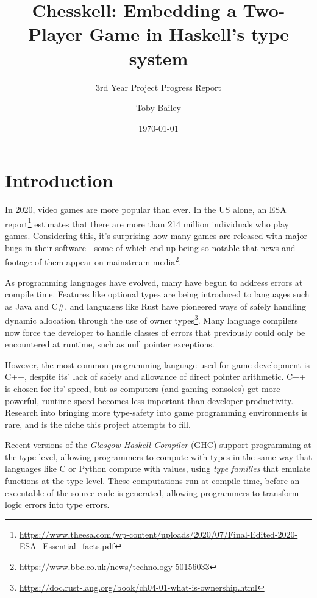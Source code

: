 \documentclass[12pt, a4paper]{scrartcl}
\title{Chesskell: Embedding a Two-Player Game in Haskell's type system}
\subtitle{3rd Year Project Progress Report}
\author{Toby Bailey}
\date{\today}
\begin{document}
\begin{titlepage}
    \maketitle
    \tableofcontents
\end{titlepage}

\section{Introduction}

In 2020, video games are more popular than ever. In the US alone, an ESA report\footnote{\url{https://www.theesa.com/wp-content/uploads/2020/07/Final-Edited-2020-ESA_Essential_facts.pdf}} estimates that there are more than 214 million individuals who play games. Considering this, it's surprising how many games are released with major bugs in their software---some of which end up being so notable that news and footage of them appear on mainstream media\footnote{\url{https://www.bbc.co.uk/news/technology-50156033}}.

As programming languages have evolved, many have begun to address errors at compile time. Features like optional types are being introduced to languages such as Java and C\#, and languages like Rust have pioneered ways of safely handling dynamic allocation through the use of owner types\footnote{\url{https://doc.rust-lang.org/book/ch04-01-what-is-ownership.html}}. Many language compilers now force the developer to handle classes of errors that previously could only be encountered at runtime, such as null pointer exceptions.

However, the most common programming language used for game development is C++\cite{gamepp}, despite its' lack of safety and allowance of direct pointer arithmetic. C++ is chosen for its' speed, but as computers (and gaming consoles) get more powerful, runtime speed becomes less important than developer productivity. Research into bringing more type-safety into game programming environments is rare, and is the niche this project attempts to fill.

Recent versions of the \emph{Glasgow Haskell Compiler} (GHC) support programming at the type level, allowing programmers to compute with types in the same way that languages like C or Python compute with values\cite{yorgey2012giving}, using \emph{type families}\cite{opentfs}\cite{closedtfs} that emulate functions at the type-level. These computations run at compile time, before an executable of the source code is generated, allowing programmers to transform logic errors into type errors\cite{twt}.
\end{document}
